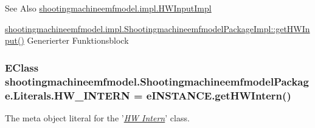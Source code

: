 \begin{DoxySeeAlso}{See Also}
\hyperlink{classshootingmachineemfmodel_1_1impl_1_1_h_w_input_impl}{shootingmachineemfmodel.\-impl.\-H\-W\-Input\-Impl} 

\hyperlink{classshootingmachineemfmodel_1_1impl_1_1_shootingmachineemfmodel_package_impl_a2b76b45b62288e086096d893264e4232}{shootingmachineemfmodel.\-impl.\-Shootingmachineemfmodel\-Package\-Impl\-::get\-H\-W\-Input()} Generierter Funktionsblock 
\end{DoxySeeAlso}
\hypertarget{interfaceshootingmachineemfmodel_1_1_shootingmachineemfmodel_package_1_1_literals_acb4d8b46ec5fe9a6ed9d4159335d3ce7}{
\subsubsection[{H\-W\-\_\-\-I\-N\-T\-E\-R\-N}]{\setlength{\rightskip}{0pt plus 5cm}E\-Class shootingmachineemfmodel.\-Shootingmachineemfmodel\-Package.\-Literals.\-H\-W\-\_\-\-I\-N\-T\-E\-R\-N = e\-I\-N\-S\-T\-A\-N\-C\-E.\-get\-H\-W\-Intern()}}\label{interfaceshootingmachineemfmodel_1_1_shootingmachineemfmodel_package_1_1_literals_acb4d8b46ec5fe9a6ed9d4159335d3ce7}
The meta object literal for the '\hyperlink{classshootingmachineemfmodel_1_1impl_1_1_h_w_intern_impl}{{\itshape H\-W Intern}}' class.

